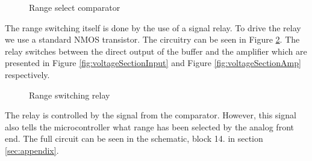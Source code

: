 \begin{figure}[h]
    \centering
    \caption{Range select comparator}
    \label{fig:voltageSectionComp}
\end{figure}

The range switching itself is done by the use of a signal relay. To drive the relay we use a standard NMOS transistor. The circuitry can be seen in Figure \ref{fig:voltageSectionRelay}. The relay switches between the direct output of the buffer and the amplifier which are presented in Figure \ref{fig:voltageSectionInput} and Figure \ref{fig:voltageSectionAmp} respectively.

\begin{figure}[h]
    \centering
    \caption{Range switching relay}
    \label{fig:voltageSectionRelay}
\end{figure}

The relay is controlled by the signal from the comparator. However, this signal also tells the microcontroller what range has been selected by the analog front end. The full circuit can be seen in the schematic, block 14. in section \ref{sec:appendix}.
\FloatBarrier